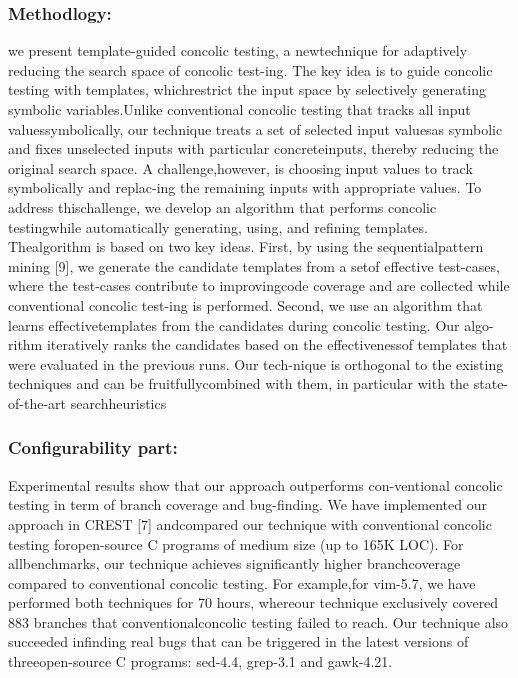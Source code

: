 \documentclass[	runningheads,
				a4paper]{llncs}
\begin{document}
\subsubsection{Methodlogy:}
we present template-guided concolic testing, a newtechnique for adaptively reducing the search space of concolic test-ing. The key idea is to guide concolic testing with templates, whichrestrict the input space by selectively generating symbolic variables.Unlike conventional concolic testing that tracks all input valuessymbolically, our technique treats a set of selected input valuesas symbolic and fixes unselected inputs with particular concreteinputs, thereby reducing the original search space. A challenge,however, is choosing input values to track symbolically and replac-ing the remaining inputs with appropriate values. To address thischallenge, we develop an algorithm that performs concolic testingwhile automatically generating, using, and refining templates. Thealgorithm is based on two key ideas. First, by using the sequentialpattern mining [9], we generate the candidate templates from a setof effective test-cases, where the test-cases contribute to improvingcode coverage and are collected while conventional concolic test-ing is performed. Second, we use an algorithm that learns effectivetemplates from the candidates during concolic testing. Our algo-rithm iteratively ranks the candidates based on the effectivenessof templates that were evaluated in the previous runs. Our tech-nique is orthogonal to the existing techniques and can be fruitfullycombined with them, in particular with the state-of-the-art searchheuristics

\subsubsection{Configurability part:}
Experimental results show that our approach outperforms con-ventional concolic testing in term of branch coverage and bug-finding. We have implemented our approach in CREST [7] andcompared our technique with conventional concolic testing foropen-source C programs of medium size (up to 165K LOC). For allbenchmarks, our technique achieves significantly higher branchcoverage compared to conventional concolic testing. For example,for vim-5.7, we have performed both techniques for 70 hours, whereour technique exclusively covered 883 branches that conventionalconcolic testing failed to reach. Our technique also succeeded infinding real bugs that can be triggered in the latest versions of threeopen-source C programs: sed-4.4, grep-3.1 and gawk-4.21.
\end{document}

